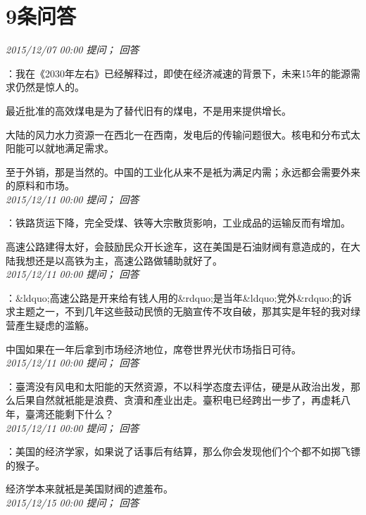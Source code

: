 \documentclass[twocolumn]{ctexart}
\begin{document}
\section{9条问答}

\textit{\hfill\noindent\small 2015/12/07 00:00 提问； 回答}

：我在《2030年左右》已经解释过，即使在经济减速的背景下，未来15年的能源需求仍然是惊人的。

最近批准的高效煤电是为了替代旧有的煤电，不是用来提供增长。

大陆的风力水力资源一在西北一在西南，发电后的传输问题很大。核电和分布式太阳能可以就地满足需求。

至于外销，那是当然的。中国的工业化从来不是衹为满足内需；永远都会需要外来的原料和市场。\\

\textit{\hfill\noindent\small 2015/12/11 00:00 提问； 回答}

：铁路货运下降，完全受煤、铁等大宗散货影响，工业成品的运输反而有增加。

高速公路建得太好，会鼓励民众开长途车，这在美国是石油财阀有意造成的，在大陆我想还是以高铁为主，高速公路做辅助就好了。\\

\textit{\hfill\noindent\small 2015/12/11 00:00 提问； 回答}

：\&ldquo;高速公路是开来给有钱人用的\&rdquo;是当年\&ldquo;党外\&rdquo;的诉求主题之一，不到几年这些鼓动民愤的无脑宣传不攻自破，那其实是年轻的我对绿营產生疑虑的滥觞。

中国如果在一年后拿到市场经济地位，席卷世界光伏市场指日可待。\\

\textit{\hfill\noindent\small 2015/12/11 00:00 提问； 回答}

：臺湾没有风电和太阳能的天然资源，不以科学态度去评估，硬是从政治出发，那么后果自然就衹能是浪费、贪瀆和產业出走。臺积电已经跨出一步了，再虚耗八年，臺湾还能剩下什么？\\

\textit{\hfill\noindent\small 2015/12/11 00:00 提问； 回答}

：美国的经济学家，如果说了话事后有结算，那么你会发现他们个个都不如掷飞镖的猴子。

经济学本来就衹是美国财阀的遮羞布。\\

\textit{\hfill\noindent\small 2015/12/15 00:00 提问； 回答}
\end{document}
